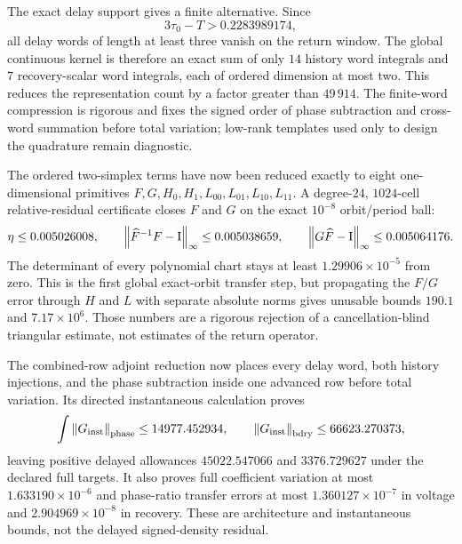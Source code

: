 The exact delay support gives a finite alternative.  Since
\[
 3\tau_0-T>0.2283989174,
\]
all delay words of length at least three vanish on the return window.  The
global continuous kernel is therefore an exact sum of only \(14\) history
word integrals and \(7\) recovery-scalar word integrals, each of ordered
dimension at most two.  This reduces the representation count by a factor
greater than \(49\,914\).  The finite-word compression is rigorous and fixes
the signed order of phase subtraction and cross-word summation before total
variation; low-rank templates used only to design the quadrature remain
diagnostic.

The ordered two-simplex terms have now been reduced exactly to eight
one-dimensional primitives \(F,G,H_0,H_1,L_{00},L_{01},L_{10},L_{11}\).
A degree-\(24\), \(1024\)-cell relative-residual certificate closes \(F\)
and \(G\) on the exact \(10^{-8}\) orbit/period ball:
\begin{equation}
 \eta\le0.005026008,\qquad
 \left\lVert\widehat F^{-1}F-\mathrm I\right\rVert_\infty\le0.005038659,\qquad
 \left\lVert G\widehat F-\mathrm I\right\rVert_\infty\le0.005064176.           \label{eq:outer-relative-residual}
\end{equation}
The determinant of every polynomial chart stays at least
\(1.29906\times10^{-5}\) from zero.  This is the first global exact-orbit
transfer step, but propagating the \(F/G\) error through \(H\) and \(L\)
with separate absolute norms gives unusable bounds \(190.1\) and
\(7.17\times10^6\).  Those numbers are a rigorous rejection of a
cancellation-blind triangular estimate, not estimates of the return
operator.

The combined-row adjoint reduction now places every delay word, both
history injections, and the phase subtraction inside one advanced row
before total variation.  Its directed instantaneous calculation proves
\[
 \int\left\lVert G_{\rm inst}\right\rVert_{\rm phase}
 \le14977.452934,\qquad
 \left\lVert G_{\rm inst}\right\rVert_{\rm bdry}\le66623.270373,
\]
leaving positive delayed allowances \(45022.547066\) and \(3376.729627\)
under the declared full targets.  It also proves full coefficient variation
at most \(1.633190\times10^{-6}\) and phase-ratio transfer errors at most
\(1.360127\times10^{-7}\) in voltage and \(2.904969\times10^{-8}\) in
recovery.  These are architecture and instantaneous bounds, not the delayed
signed-density residual.

